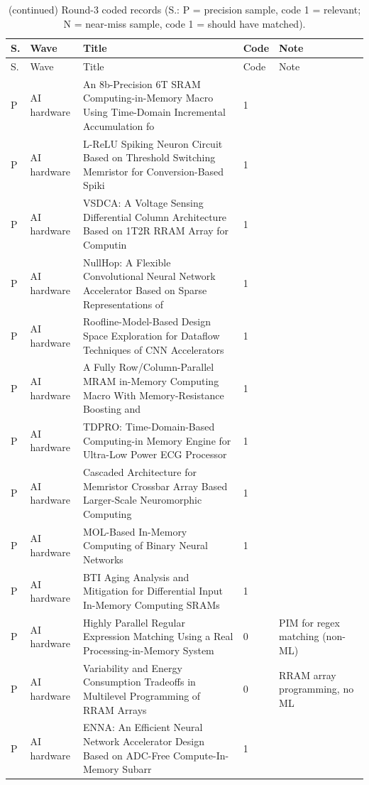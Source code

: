 \documentclass[10pt]{article}
\begin{document}
\begin{longtable}{@{}llL{8.6cm}lL{4.2cm}@{}}
\caption{(continued) Round-3 coded records (S.: P = precision sample, code 1 = relevant; N = near-miss sample, code 1 = should have matched).}\label{tab:S3b}\\
\toprule
S. & Wave & Title & Code & Note \\
\midrule
\endfirsthead
\toprule
S. & Wave & Title & Code & Note \\
\midrule
\endhead
\bottomrule
\endlastfoot
P & AI hardware & An 8b-Precision 6T SRAM Computing-in-Memory Macro Using Time-Domain Incremental Accumulation fo & 1 &  \\
P & AI hardware & L-ReLU Spiking Neuron Circuit Based on Threshold Switching Memristor for Conversion-Based Spiki & 1 &  \\
P & AI hardware & VSDCA: A Voltage Sensing Differential Column Architecture Based on 1T2R RRAM Array for Computin & 1 &  \\
P & AI hardware & NullHop: A Flexible Convolutional Neural Network Accelerator Based on Sparse Representations of & 1 &  \\
P & AI hardware & Roofline-Model-Based Design Space Exploration for Dataflow Techniques of CNN Accelerators & 1 &  \\
P & AI hardware & A Fully Row/Column-Parallel MRAM in-Memory Computing Macro With Memory-Resistance Boosting and  & 1 &  \\
P & AI hardware & TDPRO: Time-Domain-Based Computing-in Memory Engine for Ultra-Low Power ECG Processor & 1 &  \\
P & AI hardware & Cascaded Architecture for Memristor Crossbar Array Based Larger-Scale Neuromorphic Computing & 1 &  \\
P & AI hardware & MOL-Based In-Memory Computing of Binary Neural Networks & 1 &  \\
P & AI hardware & BTI Aging Analysis and Mitigation for Differential Input In-Memory Computing SRAMs & 1 &  \\
P & AI hardware & Highly Parallel Regular Expression Matching Using a Real Processing-in-Memory System & 0 & PIM for regex matching (non-ML) \\
P & AI hardware & Variability and Energy Consumption Tradeoffs in Multilevel Programming of RRAM Arrays & 0 & RRAM array programming, no ML \\
P & AI hardware & ENNA: An Efficient Neural Network Accelerator Design Based on ADC-Free Compute-In-Memory Subarr & 1 &  \\

\end{longtable}
\end{document}
